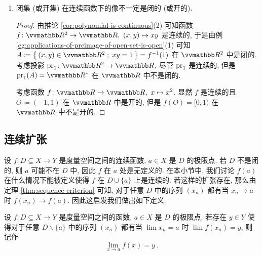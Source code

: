 \begin{example}
\begin{enumerate}
\begin{proof}
\[            \]
            由例 \ref{eg:applications-of-preimage-of-open-set-is-open}(3) 和命题 \ref{prop:property-of-closed-set}(2) 可得.
        \end{proof}
        \item 闭集 (或开集) 在连续函数下的像不一定是闭的 (或开的).
        \begin{proof}
            由推论 \ref{cor:polynomial-is-continuous}(2) 可知函数 \(f \colon \R^2 \to \R,\ (x, y) \mapsto x y\) 是连续的, 于是由例 \ref{eg:applications-of-preimage-of-open-set-is-open}(1) 可知 \(A \coloneqq \bigl\{\, (x, y) \in \R^2 \;;\; x y = 1 \,\bigr\} = f^{- 1}(1)\) 在 \(\R^2\) 中是闭的. 考虑投影 \(\pr_1 \colon \R^2 \to \R\), 尽管 \(\operatorname{pr}_1\) 是连续的, 但是 \(\pr_1(A) = \R^\ast\) 在 \(\R\) 中不是闭的.

            考虑函数 \(f \colon \R \to \R,\ x \mapsto x^2\). 显然 \(f\) 是连续的且 \(O \coloneqq (- 1, 1)\) 在 \(\R\) 中是开的, 但是 \(f(O) = [0, 1)\) 在 \(\R\) 中不是开的.
        \end{proof}
    \end{enumerate}
\end{example}

\subsection{连续扩张}

设 \(f \colon D \subseteq X \to Y\) 是度量空间之间的连续函数, \(a \in X\) 是 \(D\) 的极限点. 若 \(D\) 不是闭的, 则 \(a\) 可能不在 \(D\) 中, 因此 \(f\) 在 \(a\) 处是无定义的. 在本小节中, 我们讨论 \(f(a)\) 在什么情况下能被定义使得 \(f\) 在 \(D \cup \{a\}\) 上是连续的. 若这样的扩张存在, 那么由定理 \ref{thm:sequence-criterion} 可知, 对于任意 \(D\) 中的序列 \((x_n)\) 都有当 \(x_n \to a\) 时 \(f(x_n) \to f(a)\). 因此这启发我们做出如下定义.

\begin{definition}[函数的极限]
    设 \(f \colon D \subseteq X \to Y\) 是度量空间之间的函数, \(a \in X\) 是 \(D\) 的极限点. 若存在 \(y \in Y\) 使得对于任意 \(D \backslash \{a\}\) 中的序列 \((x_n)\) 都有当 \(\lim x_n = a\) 时 \(\lim f(x_n) = y\), 则记作
    \[
        \lim_{x \to a} f(x) = y\ .
    \]
\end{definition}

